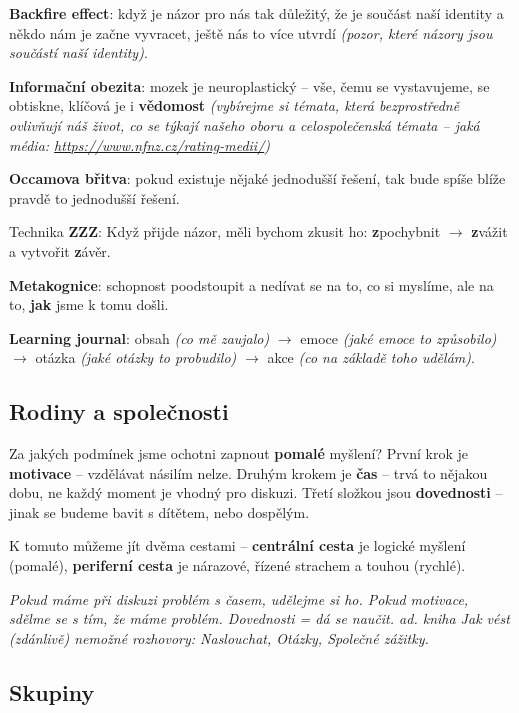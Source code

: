 \textbf{Backfire effect}: když je názor pro nás tak důležitý, že je součást naší identity a někdo nám je začne vyvracet, ještě nás to více utvrdí \textit{(pozor, které názory jsou součástí naší identity)}.

\textbf{Informační obezita}: mozek je neuroplastický -- vše, čemu se vystavujeme, se obtiskne, klíčová je i \textbf{vědomost} \textit{(vybírejme si témata, která bezprostředně ovlivňují náš život, co se týkají našeho oboru a celospolečenská témata -- jaká média: \url{https://www.nfnz.cz/rating-medii/})} 

\textbf{Occamova břitva}: pokud existuje nějaké jednodušší řešení, tak bude spíše blíže pravdě to jednodušší řešení.

Technika \textbf{ZZZ}: Když přijde názor, měli bychom zkusit ho: \textbf{z}pochybnit $\to$ \textbf{z}vážit a vytvořit \textbf{z}ávěr.

\textbf{Metakognice}: schopnost poodstoupit a nedívat se na to, co si myslíme, ale na to, \textbf{jak} jsme k tomu došli.

\textbf{Learning journal}: obsah \textit{(co mě zaujalo)} $\to$ emoce \textit{(jaké emoce to způsobilo)} $\to$ otázka \textit{(jaké otázky to probudilo)} $\to$ akce \textit{(co na základě toho udělám)}.

\subsection{Rodiny a společnosti}

Za jakých podmínek jsme ochotni zapnout \textbf{pomalé} myšlení? První krok je \textbf{motivace} -- vzdělávat násilím nelze. Druhým krokem je \textbf{čas} -- trvá to nějakou dobu, ne každý moment je vhodný pro diskuzi. Třetí složkou jsou \textbf{dovednosti} -- jinak se budeme bavit s dítětem, nebo dospělým.

K tomuto můžeme jít dvěma cestami -- \textbf{centrální cesta} je logické myšlení (pomalé), \textbf{periferní cesta} je nárazové, řízené strachem a touhou (rychlé).

\textit{Pokud máme při diskuzi problém s časem, udělejme si ho. Pokud motivace, sdělme se s tím, že máme problém. Dovednosti = dá se naučit. ad. kniha Jak vést (zdánlivě) nemožné rozhovory: Naslouchat, Otázky, Společné zážitky.}

\subsection{Skupiny}

